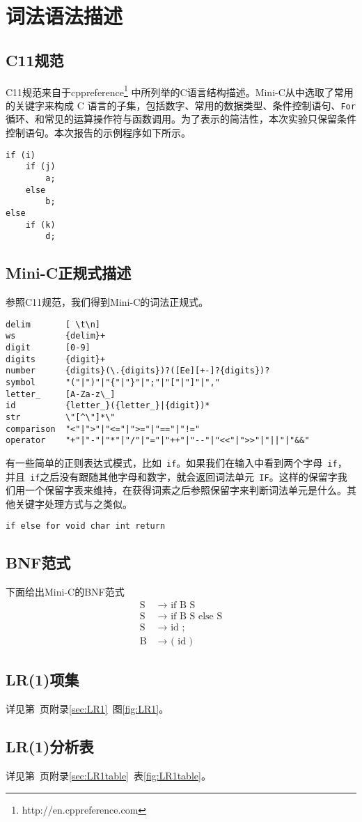 \section{词法语法描述}
\subsection{C11规范}
C11规范来自于cppreference\footnote{http://en.cppreference.com} 中所列举的C语言结构描述。Mini-C从中选取了常用的关键字来构成 C 语言的子集，包括数字、常用的数据类型、条件控制语句、\verb|For|循环、和常见的运算操作符与函数调用。为了表示的简洁性，本次实验只保留条件控制语句。本次报告的示例程序如下所示。
{\linespread{1}
\begin{lstlisting}[caption=本次实验的实验用例]
if (i)
    if (j)
        a;
    else
        b;
else
    if (k)
        d;
\end{lstlisting}}
\subsection{Mini-C正规式描述}
参照C11规范，我们得到Mini-C的词法正规式。
{\linespread{1}
\begin{lstlisting}[caption=Mini-C的词法正规式]
delim       [ \t\n]
ws          {delim}+
digit       [0-9]
digits      {digit}+
number      {digits}(\.{digits})?([Ee][+-]?{digits})?
symbol      "("|")"|"{"|"}"|";"|"["|"]"|","
letter_     [A-Za-z\_]
id          {letter_}({letter_}|{digit})*
str         \"[^\"]*\"
comparison  "<"|">"|"<="|">="|"=="|"!="
operator    "+"|"-"|"*"|"/"|"="|"++"|"--"|"<<"|">>"|"||"|"&&"
\end{lstlisting}}
有一些简单的正则表达式模式，比如~\verb|if|。如果我们在输入中看到两个字母~\verb|if|，并且~\verb|if|之后没有跟随其他字母和数字，就会返回词法单元~\verb|IF|。这样的保留字我们用一个保留字表来维持，在获得词素之后参照保留字来判断词法单元是什么。其他关键字处理方式与之类似。
{\linespread{1}
\begin{lstlisting}[caption=Mini-C的关键字]
if else for void char int return
\end{lstlisting}}
\subsection{BNF范式}
下面给出Mini-C的BNF范式
\begin{align*}
    \text{S } & \rightarrow \text{ if B S}\\
    \text{S } & \rightarrow \text{ if B S else S}\\
    \text{S } & \rightarrow \text{ id ;}\\
    \text{B } & \rightarrow \text{ ( id )}
\end{align*}
\subsection{LR(1)项集}
详见第\pageref{fig:LR1}~页附录\ref{sec:LR1}~图\ref{fig:LR1}。
\subsection{LR(1)分析表}
详见第\pageref{fig:LR1table}~页附录\ref{sec:LR1table}~表\ref{fig:LR1table}。
